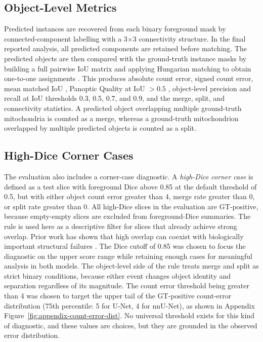 \documentclass[logo,bsc,singlespacing,parskip,online]{infthesis}
\begin{document}
\subsection{Object-Level Metrics}

Predicted instances are recovered from each binary foreground mask by
connected-component labelling with a 3$\times$3 connectivity structure. In the
final reported analysis, all predicted components are retained before matching.
The predicted objects are then compared with the ground-truth instance masks by
building a full pairwise IoU matrix and applying Hungarian matching to obtain
one-to-one assignments \citep{kuhn1955hungarian, munkres1957algorithms}. This
produces absolute count error, signed count error, mean matched IoU
\citep{taha2015metrics}, Panoptic Quality at IoU $> 0.5$
\citep{kirillov2019panoptic}, object-level precision and recall at IoU
thresholds 0.3, 0.5, 0.7, and 0.9, and the merge, split, and connectivity
statistics. A predicted object overlapping multiple ground-truth mitochondria
is counted as a merge, whereas a ground-truth mitochondrion overlapped by
multiple predicted objects is counted as a split.

\subsection{High-Dice Corner Cases}

The evaluation also includes a corner-case diagnostic. A
\emph{high-Dice corner case} is defined as a test slice with
foreground Dice above 0.85 at the default threshold of 0.5, but with either
object count error greater than 4, merge rate greater than 0, or split rate
greater than 0. All high-Dice slices in the evaluation are GT-positive,
because empty-empty slices are excluded from foreground-Dice summaries. The rule is used here
as a descriptive filter for slices that already achieve strong overlap. Prior
work has shown that high overlap can coexist with biologically important
structural failures \citep{taha2015metrics, franco-barranco2022stable,
wei2020mitoem, conrad2023instance}. The Dice cutoff of 0.85 was chosen
to focus the diagnostic on the upper score range while retaining enough cases
for meaningful analysis in both models. The object-level side of the rule
treats merge and split as strict binary conditions, because either event changes
object identity and separation regardless of its magnitude. The count error threshold 
being greater than 4 was chosen to target the upper tail 
of the GT-positive count-error distribution (75th percentile: 5 for U-Net, 4 for 
nnU-Net), as shown in Appendix Figure~\ref{fig:appendix-count-error-dist}. No 
universal threshold exists for
this kind of diagnostic, and these values are choices, but
they are grounded in the observed error distribution.
\end{document}
